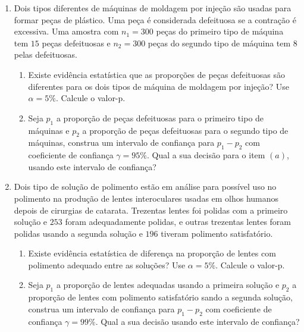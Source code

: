 \documentclass[8pt, a4paper]{article}
\begin{document}
\begin{enumerate}
	\item Dois tipos diferentes de máquinas de moldagem por injeção são usadas para formar peças de plástico. Uma peça é considerada defeituosa se a contração é excessiva. Uma amostra com $n_1=300$ peças do primeiro tipo de máquina tem $15$ peças defeituosas e $n_2=300$ peças do segundo tipo de máquina tem $8$ pelas defeituosas.
	\begin{enumerate}
		\item Existe evidência estatística que as proporções de peças defeituosas são diferentes para os dois tipos de máquina de moldagem por injeção? Use $\alpha=5\%$. Calcule o valor-p.
		\item Seja $p_1$ a proporção de peças defeituosas para o primeiro tipo de máquinas e $p_2$ a proporção de peças defeituosas para o segundo tipo de máquinas, construa um intervalo de confiança para $p_1 - p_2$ com coeficiente de confiança $\gamma=95\%$. Qual a sua decisão para o item $(a)$, usando este intervalo de confiança?
	\end{enumerate}

	\item Dois tipo de solução de polimento estão em análise para possível uso no polimento na produção de lentes  interoculares usadas em olhos humanos depois de cirurgias de catarata. Trezentas lentes foi polidas com a primeiro solução e $253$ foram adequadamente polidas, e outras trezentas lentes foram polidas usando a segunda solução e $196$ tiveram polimento satisfatório.
	\begin{enumerate}
		\item Existe evidência estatística de diferença na proporção de lentes com polimento adequado entre as soluções? Use $\alpha = 5\%$. Calcule o valor-p.
		\item Seja $p_1$ a proporção de lentes adequadas usando a primeira solução e $p_2$ a proporção de lentes com polimento satisfatório sando a segunda solução, construa um intervalo de confiança para $p_1 - p_2$ com coeficiente de confiança $\gamma=99\%$. Qual a sua decisão usando este intervalo de confiança?
	\end{enumerate}


\end{enumerate}
\end{document}
